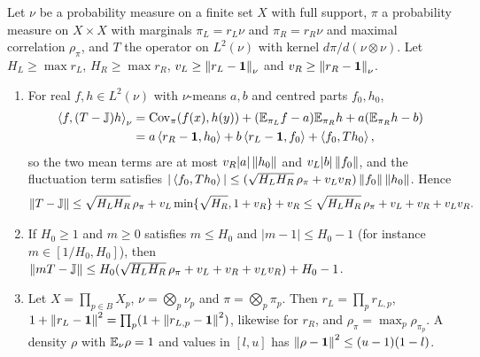\begin{lemma}\label{lem:row-comparison}
Let $\nu$ be a probability measure on a finite set $X$ with full support,
$\pi$ a probability measure on $X\times X$ with marginals $\pi_L=r_L\nu$ and
$\pi_R=r_R\nu$ and maximal correlation $\rho_\pi$, and $T$ the operator on
$L^2(\nu)$ with kernel $d\pi/d(\nu\otimes\nu)$. Let $H_L\ge\max r_L$,
$H_R\ge\max r_R$, $v_L\ge\left\|r_L-\mathbf 1\right\|_\nu$ and $v_R\ge\left\|r_R-\mathbf 1\right\|_\nu$.
\begin{enumerate}[label=\textup{(\alph*)}]
\item For real $f,h\in L^2(\nu)$ with $\nu$-means $a,b$ and centred parts
  $f_0,h_0$,
  \begin{align*}
    \left\langle f,(T-\mathbb J)h\right\rangle_\nu&=\operatorname{Cov}_\pi(f(x),h(y))+(\mathbb E_{\pi_L}f-a)\mathbb E_{\pi_R}h
    +a(\mathbb E_{\pi_R}h-b)\\
    &=a\left\langle r_R-\mathbf 1,h_0\right\rangle+b\left\langle r_L-\mathbf 1,f_0\right\rangle+\left\langle f_0,Th_0\right\rangle,
  \end{align*}
  so the two mean terms are at most $v_R|a|\left\|h_0\right\|$ and $v_L|b|\left\|f_0\right\|$, and
  the fluctuation term satisfies
  $|\left\langle f_0,Th_0\right\rangle|\le(\sqrt{H_LH_R}\,\rho_\pi+v_Lv_R)\left\|f_0\right\|\left\|h_0\right\|$. Hence
  \[
    \left\|T-\mathbb J\right\|\le\sqrt{H_LH_R}\,\rho_\pi+v_L\min\{\sqrt{H_R},1+v_R\}+v_R\le
    \sqrt{H_LH_R}\,\rho_\pi+v_L+v_R+v_Lv_R .
  \]
\item If $H_0\ge1$ and $m\ge0$ satisfies $m\le H_0$ and
  $|m-1|\le H_0-1$ (for instance
  $m\in[1/H_0,H_0]$), then
  $\left\|mT-\mathbb J\right\|\le H_0(\sqrt{H_LH_R}\,\rho_\pi+v_L+v_R+v_Lv_R)+H_0-1$.
\item Let $X=\prod_{p\in B}X_p$, $\nu=\bigotimes_p\nu_p$ and $\pi=\bigotimes_p\pi_p$.
  Then $r_L=\prod_pr_{L,p}$, $1+\left\|r_L-\mathbf 1\right\|^2=\prod_p(1+\left\|r_{L,p}-\mathbf 1\right\|^2)$,
  likewise for $r_R$, and $\rho_\pi=\max_p\rho_{\pi_p}$. A
  density $\rho$ with $\mathbb E_\nu\rho=1$ and values in $[l,u]$ has
  $\left\|\rho-\mathbf 1\right\|^2\le(u-1)(1-l)$.
\end{enumerate}
\end{lemma}

